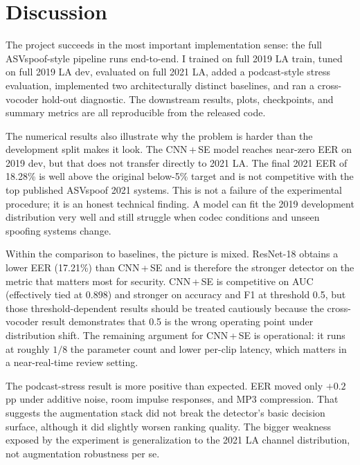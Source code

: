 \documentclass[11pt, letterpaper]{article}
\begin{document}
\section{Discussion}\label{sec:discussion}

The project succeeds in the most important implementation sense: the full ASVspoof-style pipeline runs end-to-end. I trained on full 2019 LA train, tuned on full 2019 LA dev, evaluated on full 2021 LA, added a podcast-style stress evaluation, implemented two architecturally distinct baselines, and ran a cross-vocoder hold-out diagnostic. The downstream results, plots, checkpoints, and summary metrics are all reproducible from the released code.

The numerical results also illustrate why the problem is harder than the development split makes it look. The CNN\,+\,SE model reaches near-zero EER on 2019 dev, but that does not transfer directly to 2021 LA. The final 2021 EER of 18.28\% is well above the original below-5\% target and is not competitive with the top published ASVspoof 2021 systems. This is not a failure of the experimental procedure; it is an honest technical finding. A model can fit the 2019 development distribution very well and still struggle when codec conditions and unseen spoofing systems change.

Within the comparison to baselines, the picture is mixed. ResNet-18 obtains a lower EER (17.21\%) than CNN\,+\,SE and is therefore the stronger detector on the metric that matters most for security. CNN\,+\,SE is competitive on AUC (effectively tied at 0.898) and stronger on accuracy and F1 at threshold 0.5, but those threshold-dependent results should be treated cautiously because the cross-vocoder result demonstrates that 0.5 is the wrong operating point under distribution shift. The remaining argument for CNN\,+\,SE is operational: it runs at roughly $1/8$ the parameter count and lower per-clip latency, which matters in a near-real-time review setting.

The podcast-stress result is more positive than expected. EER moved only $+0.2$\,pp under additive noise, room impulse responses, and MP3 compression. That suggests the augmentation stack did not break the detector's basic decision surface, although it did slightly worsen ranking quality. The bigger weakness exposed by the experiment is generalization to the 2021 LA channel distribution, not augmentation robustness per se.
\end{document}
